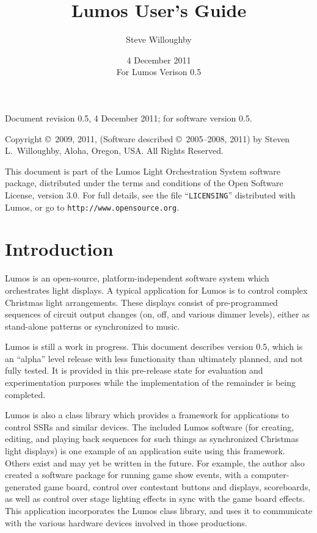 \documentclass{article}
\begin{document}
\title{Lumos User's Guide}
\author{Steve Willoughby}
\date{4 December 2011 \\ For Lumos Verison 0.5}
\maketitle
\tableofcontents
\pagebreak
\vfill
\begin{flushleft}
Document revision 0.5, 4 December 2011;
for software version 0.5.

Copyright \copyright\ 2009, 2011, 
(Software described \copyright\ 2005--2008, 2011) by
Steven L.\ Willoughby,
Aloha, Oregon, USA.  All Rights Reserved.


This document is part of the Lumos Light Orchestration System software package, distributed under the terms and conditions of the Open Software License, version 3.0.  For full details, see the file ``{\tt LICENSING}'' distributed with Lumos, or go to {\tt http://www.opensource.org}.
\end{flushleft}
\pagebreak

\section{Introduction}
Lumos is an open-source, platform-independent software system which
orchestrates light displays.  A typical application for Lumos is to control
complex Christmas light arrangements.  These displays consist of
pre-programmed sequences of circuit output changes (on, off, and various
dimmer levels), either as stand-alone patterns or synchronized to music.

Lumos is still a work in progress.  This document describes version 0.5, which
is an ``alpha'' level release with less functionaity than ultimately planned,
and not fully tested.  It is provided in this pre-release state for evaluation 
and experimentation purposes while the implementation of the remainder is 
being completed.

Lumos is also a class library which provides a framework for applications
to control SSRs and similar devices.  The included Lumos software (for creating,
editing, and playing back sequences for such things as synchronized 
Christmas light displays) is one example of an application suite using this
framework.  Others exist and may yet be written in the future.  For example,
the author also created a software package for running game show events,
with a computer-generated game board, control over contestant buttons and
displays, scoreboards, as well as control over stage lighting effects
in sync with the game board effects.  This application incorporates the
Lumos class library, and uses it to communicate with the various hardware
devices involved in those productions.
\end{document}
